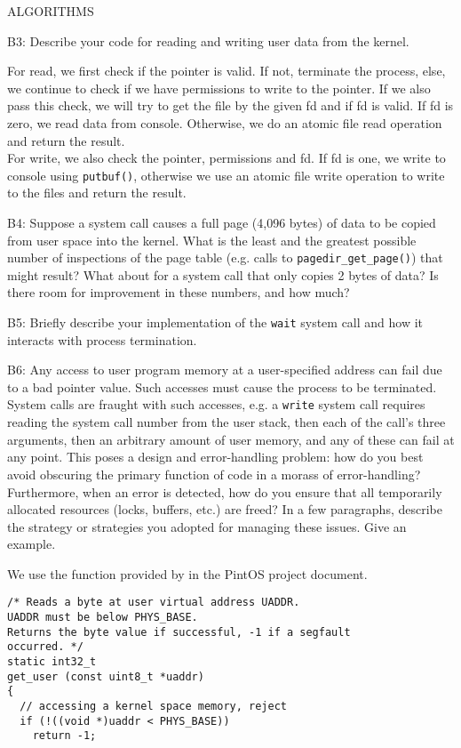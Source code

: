 \begin{aspect}{ALGORITHMS}
	\begin{qc}
		B3: Describe your code for reading and writing user data from the kernel.
	\end{qc}
	For read, we first check if the pointer is valid. If not, terminate the process, else, we continue to check if we have permissions to write to the pointer. If we also pass this check, we will try to get the file by the given fd and if fd is valid. If fd is zero, we read data from console. Otherwise, we do an atomic file read operation and return the result.\\
	For write, we also check the pointer, permissions and fd. If fd is one, we write to console using \lstinline{putbuf()}, otherwise we use an atomic file write operation to write to the files and return the result.

	\begin{qc}
		B4: Suppose a system call causes a full page (4,096 bytes) of data to be copied from user space into the kernel.
		What is the least and the greatest possible number of inspections of the page table (e.g. calls to \lstinline{pagedir_get_page()}) that might result?
		What about for a system call that only copies 2 bytes of data?
		Is there room for improvement in these numbers, and how much?
	\end{qc}

	\begin{qc}
		B5: Briefly describe your implementation of the \lstinline{wait} system call
		and how it interacts with process termination.
	\end{qc}

	\begin{qc}
		B6: Any access to user program memory at a user-specified address can fail due to a bad pointer value.
		Such accesses must cause the process to be terminated.
		System calls are fraught with such accesses,
		e.g. a \lstinline{write} system call requires reading the system call number from the user stack,
		then each of the call's three arguments, then an arbitrary amount of user memory, and any of these can fail at any point.
		This poses a design and error-handling problem: how do you best avoid obscuring the primary function of code in a morass of error-handling?
		Furthermore, when an error is detected, how do you ensure that all temporarily allocated resources (locks, buffers, etc.) are freed?
		In a few paragraphs, describe the strategy or strategies you adopted for managing these issues.
		Give an example.
	\end{qc}
	We use the function provided by in the PintOS project document.
	\begin{lstlisting}
/* Reads a byte at user virtual address UADDR.
UADDR must be below PHYS_BASE.
Returns the byte value if successful, -1 if a segfault
occurred. */
static int32_t
get_user (const uint8_t *uaddr)
{
  // accessing a kernel space memory, reject
  if (!((void *)uaddr < PHYS_BASE))
    return -1;


\end{lstlisting}
\end{aspect}

